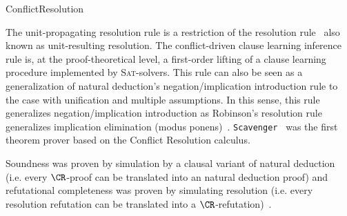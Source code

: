 \begin{entry}{ConflictResolution}
\begin{history}
The unit-propagating resolution rule is a restriction of the resolution rule~ 
also known as unit-resulting resolution. The conflict-driven clause learning inference rule is,
at the proof-theoretical level, a first-order lifting of a clause learning procedure implemented by 
\textsc{Sat}-solvers. This rule can also be seen as a generalization of natural deduction's negation/implication introduction rule to the case with unification and multiple assumptions. In this sense, this rule generalizes negation/implication introduction as Robinson's resolution rule generalizes implication elimination (modus ponens)~\cite{UniversalityOfProofs}. \texttt{Scavenger}~\cite{CADE} was the first theorem prover based on the Conflict Resolution calculus.
\end{history}

\begin{technicalities}
Soundness was proven by simulation by a clausal variant of natural deduction  (i.e. every $\CR$-proof can be translated into an natural deduction proof) and refutational completeness was proven by simulating resolution  (i.e. every resolution refutation can be translated into a $\CR$-refutation)~\cite{ConflictResolution}.
\end{technicalities}


\end{entry}
